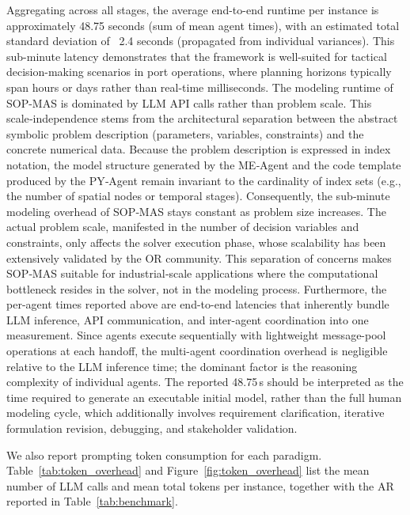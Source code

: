 \documentclass[preprint,12pt]{elsarticle}
\begin{document}
Aggregating across all stages, the average end-to-end runtime per instance is approximately 48.75 seconds (sum of mean agent times), with an estimated total standard deviation of ~2.4 seconds (propagated from individual variances). This sub-minute latency demonstrates that the framework is well-suited for tactical decision-making scenarios in port operations, where planning horizons typically span hours or days rather than real-time milliseconds. The modeling runtime of SOP-MAS is dominated by LLM API calls rather than problem scale. This scale‑independence stems from the architectural separation between the abstract symbolic problem description (parameters, variables, constraints) and the concrete numerical data. Because the problem description is expressed in index notation, the model structure generated by the ME‑Agent and the code template produced by the PY‑Agent remain invariant to the cardinality of index sets (e.g., the number of spatial nodes or temporal stages). Consequently, the sub‑minute modeling overhead of SOP‑MAS stays constant as problem size increases. The actual problem scale, manifested in the number of decision variables and constraints, only affects the solver execution phase, whose scalability has been extensively validated by the OR community. This separation of concerns makes SOP‑MAS suitable for industrial‑scale applications where the computational bottleneck resides in the solver, not in the modeling process. Furthermore, the per-agent times reported above are end-to-end latencies that inherently bundle LLM inference, API communication, and inter-agent coordination into one measurement. Since agents execute sequentially with lightweight message-pool operations at each handoff, the multi-agent coordination overhead is negligible relative to the LLM inference time; the dominant factor is the reasoning complexity of individual agents. The reported 48.75\,s should be interpreted as the time required to generate an executable initial model, rather than the full human modeling cycle, which additionally involves requirement clarification, iterative formulation revision, debugging, and stakeholder validation.

We also report prompting token consumption for each paradigm. Table~\ref{tab:token_overhead} and Figure~\ref{fig:token_overhead} list the mean number of LLM calls and mean total tokens per instance, together with the AR reported in Table~\ref{tab:benchmark}.
\end{document}
